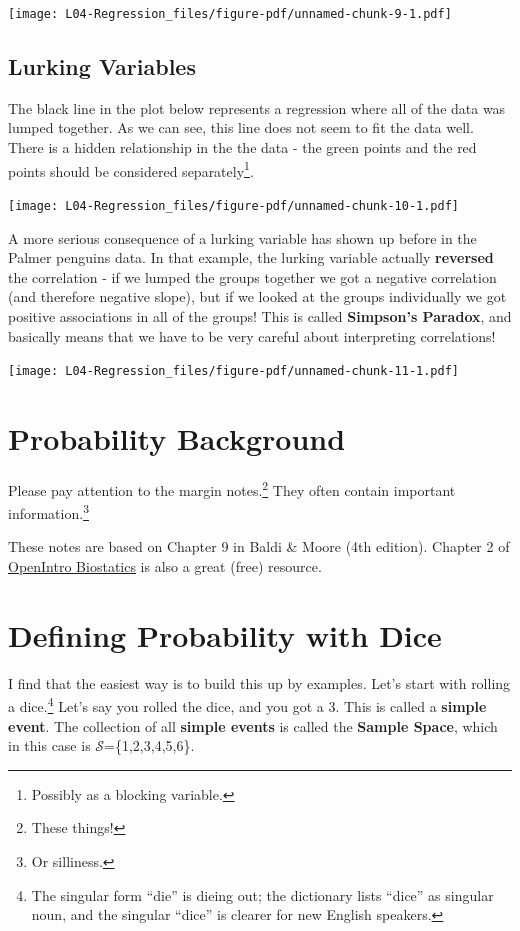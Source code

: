 \documentclass[
  letterpaper,
  DIV=11,
  numbers=noendperiod]{scrreprt}
\begin{document}
\texttt{[image: L04-Regression\_files/figure-pdf/unnamed-chunk-9-1.pdf]}

\hypertarget{lurking-variables}{%
\section{Lurking Variables}\label{lurking-variables}}

The black line in the plot below represents a regression where all of
the data was lumped together. As we can see, this line does not seem to
fit the data well. There is a hidden relationship in the the data - the
green points and the red points should be considered
separately\footnote{Possibly as a blocking variable.}.

\texttt{[image: L04-Regression\_files/figure-pdf/unnamed-chunk-10-1.pdf]}

A more serious consequence of a lurking variable has shown up before in
the Palmer penguins data. In that example, the lurking variable actually
\textbf{reversed} the correlation - if we lumped the groups together we
got a negative correlation (and therefore negative slope), but if we
looked at the groups individually we got positive associations in all of
the groups! This is called \textbf{Simpson's Paradox}, and basically
means that we have to be very careful about interpreting correlations!

\texttt{[image: L04-Regression\_files/figure-pdf/unnamed-chunk-11-1.pdf]}

\hypertarget{probability-background}{%
\chapter{Probability Background}\label{probability-background}}

Please pay attention to the margin notes.\footnote{These things!} They
often contain important information.\footnote{Or silliness.}

These notes are based on Chapter 9 in Baldi \& Moore (4th edition).
Chapter 2 of \href{https://www.openintro.org/book/biostat}{OpenIntro
Biostatics} is also a great (free) resource.

\hypertarget{defining-probability-with-dice}{%
\chapter{Defining Probability with
Dice}\label{defining-probability-with-dice}}

I find that the easiest way is to build this up by examples. Let's start
with rolling a dice.\footnote{The singular form ``die'' is dieing out;
  the dictionary lists ``dice'' as singular noun, and the singular
  ``dice'' is clearer for new English speakers.} Let's say you rolled
the dice, and you got a 3. This is called a \textbf{simple event}. The
collection of all \textbf{simple events} is called the \textbf{Sample
Space}, which in this case is \(\mathcal S\)=\{1,2,3,4,5,6\}.
\end{document}
